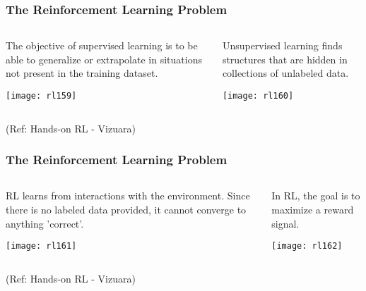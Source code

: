 \begin{frame}[fragile]\frametitle{The Reinforcement Learning Problem}

\begin{columns}
    \begin{column}[T]{0.5\linewidth}
		The objective of supervised learning is to be able to generalize or extrapolate in situations not present in the training dataset.

		\begin{center}
		\texttt{[image: rl159]}

		\end{center}

    \end{column}
    \begin{column}[T]{0.5\linewidth}
		Unsupervised learning finds structures that are hidden in collections of unlabeled data.

		\begin{center}
		\texttt{[image: rl160]}

		\end{center}
    \end{column}
  \end{columns}

{\tiny (Ref: Hands-on RL - Vizuara)}

\end{frame}

\begin{frame}[fragile]\frametitle{The Reinforcement Learning Problem}

\begin{columns}
    \begin{column}[T]{0.5\linewidth}
		RL learns from interactions with the environment. Since there is no labeled data provided, it cannot converge to anything 'correct'.

		\begin{center}
		\texttt{[image: rl161]}

		\end{center}

    \end{column}
    \begin{column}[T]{0.5\linewidth}
		In RL, the goal is to maximize a reward signal. 

		\begin{center}
		\texttt{[image: rl162]}

		\end{center}
    \end{column}
  \end{columns}

{\tiny (Ref: Hands-on RL - Vizuara)}

\end{frame}

